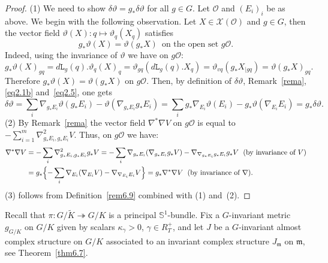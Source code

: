 \documentclass[a4paper,reqno]{amsart}
\theoremstyle{definition}
\theoremstyle{remark}
\theoremstyle{plain}
\numberwithin{equation}{section}
\newcommand{\bbS}{{\mathbb{S}}}
\newcommand{\calX}{{\mathcal{X}}}
\newcommand{\calO}{{\mathcal{O}}}  \newcommand{\cO}{{\mathcal{O}}}
\newcommand{\fm}{{\mathfrak{m}}}
\newcommand{\sto}{\twoheadrightarrow}
\newcommand{\mto}{\mapsto}
\newcommand{\vtheta}{\vartheta}
\newcommand{\Kt}{{\widetilde{K}}}
\newcommand{\ltr}{\mathtt{L}}
\begin{document}
\begin{proof}
(1)  We need to show $\delta\vtheta = g_* \delta\vtheta$ for all $g \in G$.
Let $\calO$ and $(E_i)_i$ be as above.  We begin with the
 following observation.
 Let $X \in \calX(\calO)$ and $g\in G$, then the
vector field $\vtheta(X) : q \mto \vtheta_q(X_q)$ satisfies
\begin{equation}
  \label{eq2.5}
  g_* \vtheta(X) = \vtheta(g_*X) \ \; \text{on the open set $g\calO$}.
\end{equation}
Indeed, using the invariance of $\vtheta$ we have on $g\calO$:
\[
 g_* \vtheta(X)_{gq} = d\ltr_g(q).\vtheta_q(X)_q =
 \vtheta_{gq}(d\ltr_g(q).X_q) = \vtheta_{vq}(g_*X_{\mid gq}) =
 \vtheta(g_*X)_{gq}. 
\]
Therefore $g_*\vtheta(X) = \vtheta(g_*X)$ on $g\calO$.
Then,  by definition of
 $\delta\vtheta$, Remark~\ref{rema}, \eqref{eq2.1b} and~\eqref{eq2.5}, one gets
\[
 \delta\vtheta  =  \sum_{i}
  \nabla_{g_*E_i} \vtheta(g_*E_i) -   \vtheta(\nabla_{g_*E_i} g_*E_i)
 =  \sum_{i}g_*\nabla_{E_i}\vtheta(E_i)  - 
   g_*\vtheta(\nabla_{E_i} E_i) = g_* \delta\vtheta. 
\]
{\rm (2)} By Remark~\ref{rema} the vector field
$\nabla^*\nabla V$ on $g\calO$
  is equal to $-\sum_{i=1}^m
  \nabla^2_{g_*E_i,g_*E_i}V$. Thus, on $g\calO$ we have:
  \begin{align*}
    \nabla^*\nabla V & =   -\sum_i \nabla^2_{g_*E_i,g_*E_i}g_*V =
    -\sum_i \nabla_{g_*E_i}(\nabla_{g_*E_i}g_*V) -
    \nabla_{\nabla_{g_*E_i}g_*E_i}g_*V \ \; \text{(by invariance
    of $V$)}
    \\
   & = g_*\Bigl\{ -\sum_i \nabla_{E_i}(\nabla_{E_i}V) -
    \nabla_{\nabla_{E_i}E_i}V\Bigr\}  = g_* \nabla^*\nabla V \ \;
     \text{(by invariance of $\nabla$)}.
  \end{align*}
 {\rm (3)} follows from Definition~\ref{rem6.9} combined with  (1) and~(2).
\end{proof}


Recall that $\pi : G/\Kt \sto G/K$ is a principal
$\bbS^1$-bundle.  Fix a $G$-invariant metric
$g_{\scriptscriptstyle{G/K}}$ on $G/K$ given by scalars
$\kappa_\gamma >0$, $\gamma \in R_T^+$, and let $J$ be a
$G$-invariant almost complex structure on $G/K$ associated to an
invariant complex structure $J_\fm$ on $\fm$, see
Theorem~\ref{thm6.7}.
\end{document}
